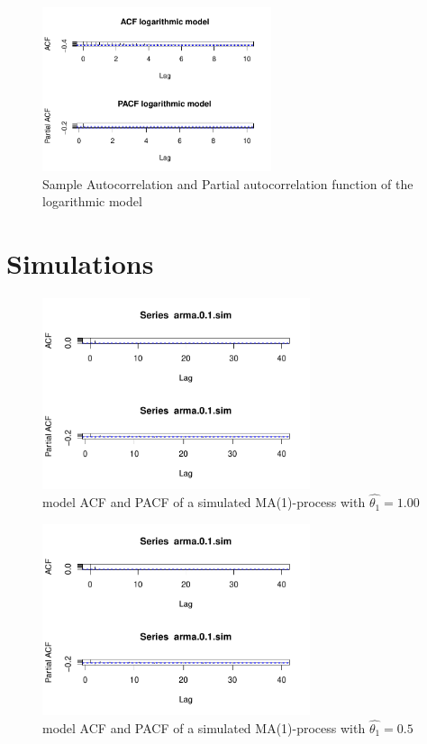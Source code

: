 \documentclass[11pt,a4paper]{article}
\begin{document}
\begin{figure}
\centering
\includegraphics[angle=0,
width=0.6\textwidth]{acf_pacf_logmodel}
\caption{Sample Autocorrelation and Partial autocorrelation function of the logarithmic model
\label{fig:acf_logmodel}}
\end{figure}




\section{Simulations}
\begin{figure}
    \centering
    \includegraphics[width=0.7\textwidth]{sim_ma_1_00}
    \caption{model ACF and PACF of a simulated MA(1)-process with $\hat{\theta_1} = 1.00$ }
    \label{fig:sim_ma_1_00}
\end{figure}

\begin{figure}
    \centering
    \includegraphics[width=0.7\textwidth]{sim_ma_1_00}
    \caption{model ACF and PACF of a simulated MA(1)-process with $\hat{\theta_1} = 0.5$ }
    \label{fig:sim_ma_1_05}
\end{figure}
\end{document}
